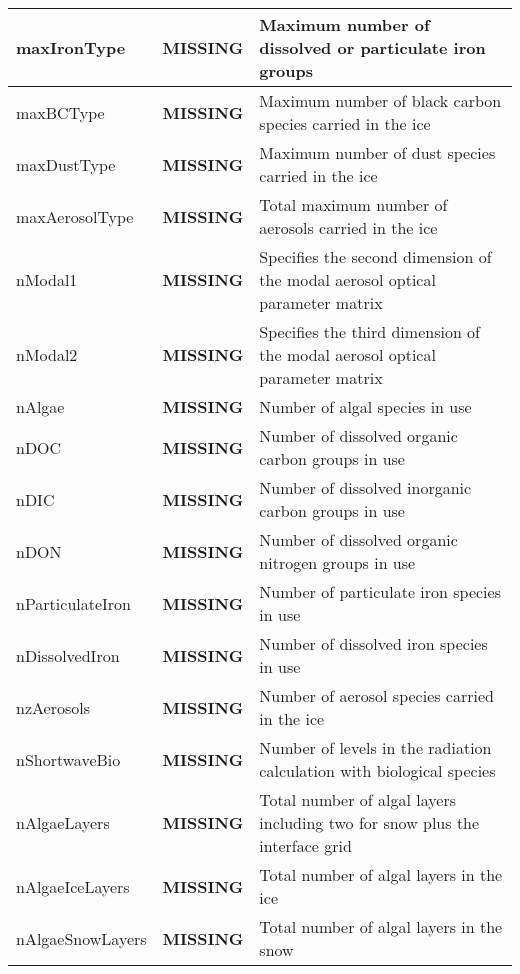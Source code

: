 {\begin{center}
\begin{longtable}{| p{1.0in} || p{1.0in} | p{4.0in} |}
    \hline
    maxIronType & {\bf \color{red} MISSING} & Maximum number of dissolved or particulate iron groups \\ 
    \hline
    maxBCType & {\bf \color{red} MISSING} & Maximum number of black carbon species carried in the ice \\ 
    \hline
    maxDustType & {\bf \color{red} MISSING} & Maximum number of dust species carried in the ice \\ 
    \hline
    maxAerosolType & {\bf \color{red} MISSING} & Total maximum number of aerosols carried in the ice \\ 
    \hline
    nModal1 & {\bf \color{red} MISSING} & Specifies the second dimension of the modal aerosol optical parameter matrix \\ 
    \hline
    nModal2 & {\bf \color{red} MISSING} & Specifies the third dimension of the modal aerosol optical parameter matrix \\ 
    \hline
    nAlgae & {\bf \color{red} MISSING} & Number of algal species in use \\ 
    \hline
    nDOC & {\bf \color{red} MISSING} & Number of dissolved organic carbon groups in use \\ 
    \hline
    nDIC & {\bf \color{red} MISSING} & Number of dissolved inorganic carbon groups in use \\ 
    \hline
    nDON & {\bf \color{red} MISSING} & Number of dissolved organic nitrogen groups in use \\ 
    \hline
    nParticulateIron & {\bf \color{red} MISSING} & Number of particulate iron species in use \\ 
    \hline
    nDissolvedIron & {\bf \color{red} MISSING} & Number of dissolved iron species in use \\ 
    \hline
    nzAerosols & {\bf \color{red} MISSING} & Number of aerosol species carried in the ice \\ 
    \hline
    nShortwaveBio & {\bf \color{red} MISSING} & Number of levels in the radiation calculation with biological species \\ 
    \hline
    nAlgaeLayers & {\bf \color{red} MISSING} & Total number of algal layers including two for snow plus the interface grid \\ 
    \hline
    nAlgaeIceLayers & {\bf \color{red} MISSING} & Total number of algal layers in the ice \\ 
    \hline
    nAlgaeSnowLayers & {\bf \color{red} MISSING} & Total number of algal layers in the snow \\ 

\end{longtable}
\end{center}}
